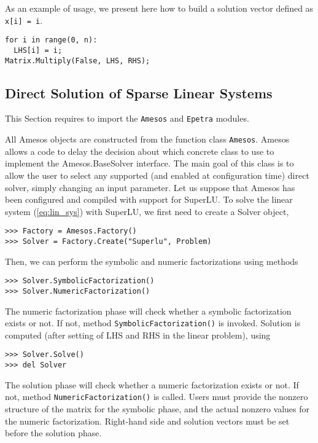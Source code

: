 \documentclass[10pt,relax]{SANDreport}
\begin{document}
As an example of usage, we present here how to build a solution vector
defined as \verb!x[i] = i!.
\begin{verbatim}
for i in range(0, n):
  LHS[i] = i;
Matrix.Multiply(False, LHS, RHS);
\end{verbatim}

\subsection{Direct Solution of Sparse Linear Systems}
\label{sec:direct}

This Section requires to import the {\tt Amesos} and {\tt Epetra} modules.

All Amesos objects are constructed from the function class
\verb!Amesos!.  Amesos allows a code to delay the
decision about which concrete class to use to implement the
Amesos.BaseSolver interface. The main goal of this class is to allow
the user to select any supported (and enabled at configuration time)
direct solver, simply changing an input parameter. Let us suppose that Amesos
has been configured and compiled with support for SuperLU. To solve the linear
system (\ref{eq:lin_sys}) with SuperLU, we first need to create a Solver
object,
\begin{verbatim}
>>> Factory = Amesos.Factory()
>>> Solver = Factory.Create("Superlu", Problem)
\end{verbatim}
Then, we can perform the symbolic and numeric factorizations using methods
\begin{verbatim}
>>> Solver.SymbolicFactorization()
>>> Solver.NumericFactorization()
\end{verbatim}
The numeric factorization phase will check whether a symbolic
factorization exists or not. If not, method
\verb!SymbolicFactorization()! is invoked.  Solution is computed (after
setting of LHS and RHS in the linear problem), using
\begin{verbatim}
>>> Solver.Solve()
>>> del Solver
\end{verbatim}
The solution phase will check whether a numeric factorization exists or
not. If not, method \verb!NumericFactorization()! is called.
Users must provide the nonzero structure of the matrix for the symbolic
phase, and the actual nonzero values for the numeric
factorization. Right-hand side and solution vectors must be set before
the solution phase.
  
\end{document}
